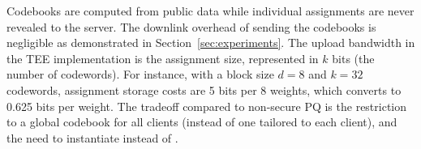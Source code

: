 


Codebooks are computed from public data while individual assignments are never revealed to the server.
The downlink overhead of sending the codebooks is negligible as demonstrated in Section~\ref{sec:experiments}.
The upload bandwidth in the TEE implementation is the assignment size, represented in $k$ bits (the number of codewords).
For instance, with a block size $d=8$ and $k=32$ codewords, assignment storage costs are 5 bits per 8 weights, which converts to 0.625 bits per weight.
The tradeoff compared to non-secure PQ is the restriction to a global codebook for all clients (instead of one tailored to each client), and the need to instantiate \SecInd instead of \SecAgg. 
